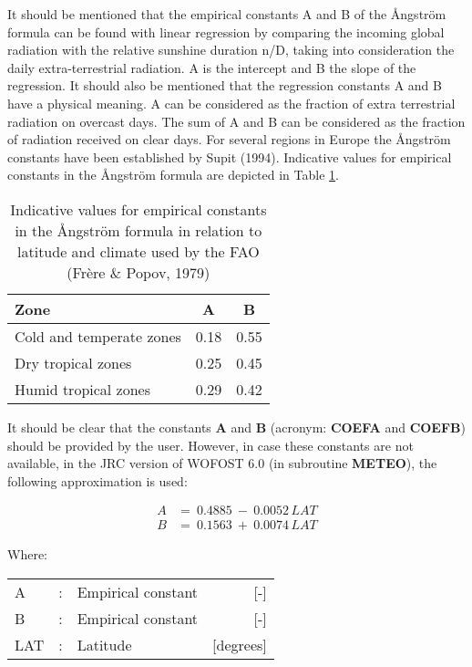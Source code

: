 It should be mentioned that the empirical constants A and B of the \AA ngstr\"{o}m formula 
can be found with linear regression by comparing the incoming global radiation with the
relative sunshine duration n/D, taking into consideration the daily extra-terrestrial
radiation. A is the intercept and B the slope of the regression. It should also be mentioned
that the regression constants A and B have a physical meaning. A can be considered as
the fraction of extra terrestrial radiation on overcast days. The sum of A and B can be
considered as the fraction of radiation received on clear days.
For several regions in Europe the \AA ngstr\"{o}m constants have been established by Supit
(1994). Indicative values for empirical constants in the \AA ngstr\"{o}m formula are 
depicted in Table \ref{tab:angstAB}.

\begin{table}
\centering
\caption{Indicative values for empirical constants in the \AA ngstr\"{o}m formula in
relation to latitude and climate used by the FAO (Fr\`{e}re \& Popov, 1979)}
\label{tab:angstAB}
\begin{tabular}{lcc}
\hline
Zone &   A &  B  \\
\hline
Cold and temperate zones   &  0.18 &  0.55\\
Dry tropical zones  &   0.25  & 0.45\\
Humid tropical zones  &   0.29 &  0.42\\
\hline
\end{tabular}
\end{table}

It should be clear that the constants {\bf A} and {\bf B} (acronym: {\bf COEFA} and {\bf COEFB}) should be
provided by the user. However, in case these constants are not available, in the JRC
version of WOFOST 6.0 (in subroutine {\bf METEO}), the following approximation is used:

\begin{align*}
 A &=~0.4885~-~0.0052 \, LAT \\
 B &=~0.1563~+~0.0074 \, LAT 
\end{align*}

Where:\\[5pt]
\begin{tabularx}{\textwidth}{llXr}
A &:& Empirical constant  & [-]\\
B &:& Empirical constant  & [-]\\
LAT &:& Latitude  & [degrees]\\
\end{tabularx}

